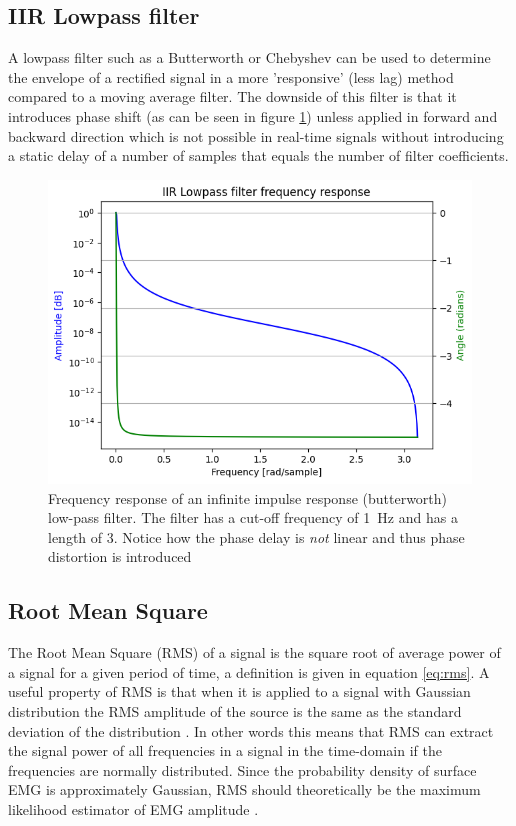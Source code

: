 \subsection{IIR Lowpass filter}
A lowpass filter such as a Butterworth or Chebyshev can be used to determine the envelope of a rectified signal in a more 'responsive' (less lag) method compared to a moving average filter. The downside of this filter is that it introduces phase shift (as can be seen in figure \ref{fig:iirfilter_phaseshift}) unless applied in forward and backward direction \cite{rose2011electromyogram} which is not possible in real-time signals without introducing a static delay of a number of samples that equals the number of filter coefficients.

\begin{figure}[h!t]
	\begin{center}
		\includegraphics[width=0.7\columnwidth]{images/iirfilter_phaseshift.png}
	\end{center}
	\caption{Frequency response of an infinite impulse response (butterworth) low-pass filter. The filter has a cut-off frequency of \SI{1}{Hz} and has a length of 3. Notice how the phase delay is \textit{not} linear and thus phase distortion is introduced}
	\label{fig:iirfilter_phaseshift}
\end{figure}

\subsection{Root Mean Square}
The Root Mean Square (RMS) of a signal is the square root of average power of a signal for a given period of time, a definition is given in equation \ref{eq:rms}. A useful property of RMS is that when it is applied to a signal with Gaussian distribution the RMS amplitude of the source is the same as the standard deviation of the distribution \cite{rms_standard_deviation}. In other words this means that RMS can extract the signal power of all frequencies in a signal in the time-domain if the frequencies are normally distributed. Since the probability density of surface EMG is approximately Gaussian, RMS should theoretically be the maximum likelihood estimator of EMG amplitude \cite{semg_signals_analysis_and_applications}.

